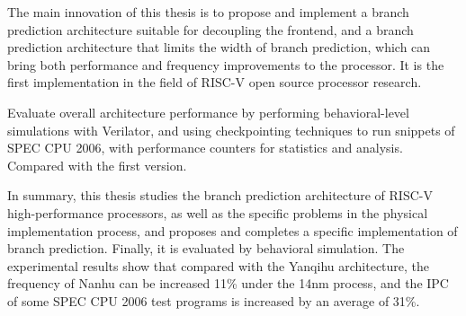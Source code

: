 {    The main innovation of this thesis is to propose and implement a branch prediction architecture suitable for decoupling the frontend, and a branch prediction architecture that limits the width of branch prediction, which can bring both performance and frequency improvements to the processor. It is the first implementation in the field of RISC-V open source processor research. 

    Evaluate overall architecture performance by performing behavioral-level simulations with Verilator, and using checkpointing techniques to run snippets of SPEC CPU 2006, with performance counters for statistics and analysis. Compared with the first version. 

    In summary, this thesis studies the branch prediction architecture of RISC-V high-performance processors, as well as the specific problems in the physical implementation process, and proposes and completes a specific implementation of branch prediction. Finally, it is evaluated by behavioral simulation. The experimental results show that compared with the Yanqihu architecture, the frequency of Nanhu can be increased 11\% under the 14nm process, and the IPC of some SPEC CPU 2006 test programs is increased by an average of 31\%. 

}



\makeenabstract